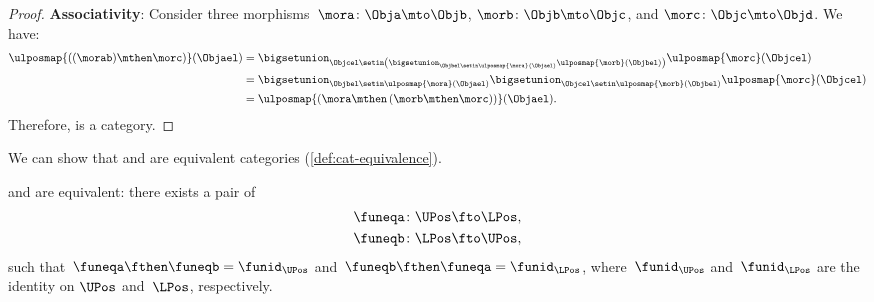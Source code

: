 \begin{proof}
    \textbf{Associativity}:
    Consider three morphisms~$\mora\colon \Obja \mto \Objb$, $\morb\colon \Objb\mto \Objc$, and $\morc \colon \Objc\mto \Objd$.
    We have:
    \begin{equation}
        \begin{aligned}
            \ulposmap{\left( (\morab) \mthen \morc\right)}(\Objael) & =
            \bigsetunion_{\Objcel \setin \left( \bigsetunion_{\Objbel \setin \ulposmap{\mora}(\Objael)}\ulposmap{\morb}(\Objbel)\right)}\ulposmap{\morc}(\Objcel) \\
                                                                    & =\bigsetunion_{\Objbel\setin \ulposmap{\mora}(\Objael)}\bigsetunion_{\Objcel\setin \ulposmap{\morb}(\Objbel)}\ulposmap{\morc}(\Objcel) \\
                                                                    & =\ulposmap{\left( \mora \mthen \left( \morb\mthen \morc\right)\right)}(\Objael).
        \end{aligned}
    \end{equation}
    Therefore, \UPos is a category.
\end{proof}

We can show that \UPos and \LPos are equivalent categories (\cref{def:cat-equivalence}).

\begin{lemma}
    \label{lem:ulposequiv}
    \UPos and \LPos are equivalent: there exists a pair of  \begin{equation}
        \begin{aligned}
            \funeqa\colon \UPos & \fto \LPos, \\
            \funeqb\colon \LPos & \fto \UPos,
        \end{aligned}
    \end{equation}
    such that~$\funeqa \fthen \funeqb=\funid_{\UPos}$ and~$\funeqb \fthen \funeqa=\funid_{\LPos}$, where~$\funid_{\UPos}$ and~$\funid_{\LPos}$ are the identity  on $\UPos$ and~$\LPos$, respectively.
\end{lemma}


